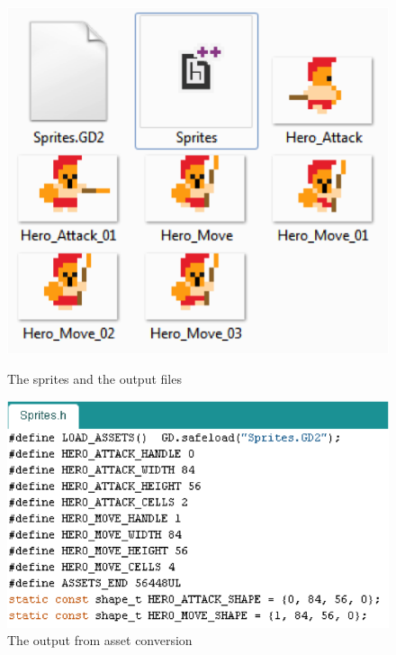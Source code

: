 \begin{figure}[H]
\begin{minipage}[b]{0.45\linewidth}
  \centering
  \includegraphics[scale=0.7]{Figures/Asset_output}
  \caption{The sprites and the output files}
  \label{fig:Asset_output}
\end{minipage}
\hspace{0.5cm}
\begin{minipage}[b]{0.45\linewidth}
  \centering
  \includegraphics[scale=0.7]{Figures/SpritesHeader}
  \caption{The output from asset conversion}
  \label{fig:SpritesHeader}
\end{minipage}
\end{figure}

